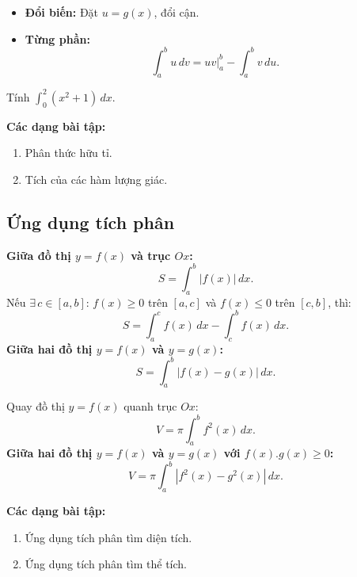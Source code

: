 \documentclass[12pt,a4paper]{article}
\begin{document}
\begin{phuongphap}[title={Các phương pháp tính tích phân}]
  \begin{itemize}
    \item \textbf{Đổi biến:} Đặt $u = g(x)$, đổi cận.
    \item \textbf{Từng phần:}
      \[
        \int_a^b u\,dv = uv\bigr|_a^b - \int_a^b v\,du.
      \]
  \end{itemize}
\end{phuongphap}

\begin{vidu}
  Tính $\displaystyle\int_0^2 (x^2 + 1)\,dx$.
\end{vidu}

\medskip\noindent\textbf{Các dạng bài tập:}
\begin{enumerate}[label=\textbf{Dạng \arabic*:}, leftmargin=*, align=left]
  \item Phân thức hữu tỉ.
  \item Tích của các hàm lượng giác.
\end{enumerate}

\subsection{Ứng dụng tích phân}

\begin{congthuc}[title={Diện tích hình phẳng}]
  \textbf{Giữa đồ thị $y = f(x)$ và trục $Ox$:}
  \[
    S = \int_a^b \bigl|f(x)\bigr|\,dx.
  \]
  Nếu $\exists\, c \in [a,b]$: $f(x) \ge 0$ trên $[a,c]$ và $f(x) \le 0$ trên $[c,b]$, thì:
  \[
    S = \int_a^c f(x)\,dx - \int_c^b f(x)\,dx.
  \]
  \textbf{Giữa hai đồ thị $y = f(x)$ và $y = g(x)$:}
  \[
    S = \int_a^b \bigl|f(x) - g(x)\bigr|\,dx.
  \]
\end{congthuc}

\begin{congthuc}[title={Thể tích vật thể tròn xoay}]
  Quay đồ thị $y = f(x)$ quanh trục $Ox$:
  \[
    V = \pi \int_a^b f^2(x)\,dx.
  \]
  \textbf{Giữa hai đồ thị $y = f(x)$ và $y = g(x)$ với $f(x).g(x) \ge 0$:}
  \[
    V = \pi \int_a^b |f^2(x) - g^2(x)|\,dx.
  \]
\end{congthuc}

\medskip\noindent\textbf{Các dạng bài tập:}
\begin{enumerate}[label=\textbf{Dạng \arabic*:}, leftmargin=*, align=left]
  \item Ứng dụng tích phân tìm diện tích.
  \item Ứng dụng tích phân tìm thể tích.
\end{enumerate}
\end{document}
